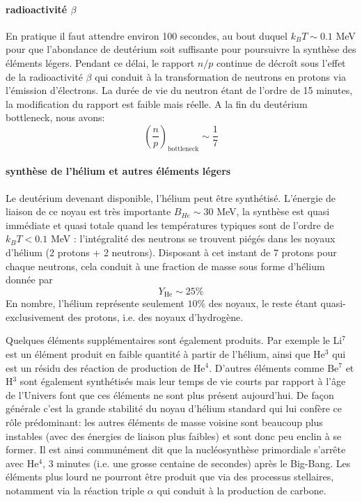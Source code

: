 \paragraph{radioactivité $\beta$} En pratique il faut attendre environ 100 secondes, au bout duquel $k_B T\sim 0.1$ MeV pour que l'abondance de deutérium soit suffisante pour poursuivre la synthèse des éléments légers. Pendant ce délai, le rapport $n/p$ continue de décroît sous l'effet de la radioactivité $\beta$ qui conduit à la transformation de neutrons en protons via l'émission d'électrons. La durée de vie du neutron étant de l'ordre de 15 minutes, la modification du rapport est faible mais réelle. A la fin du deutérium bottleneck, nous avons:
\begin{equation}
\left(\frac{n}{p}\right)_\mathrm{bottleneck} \sim \frac{1}{7}
\end{equation}

\paragraph{synthèse de l'hélium et autres éléments légers}
Le deutérium devenant disponible, l'hélium peut être synthétisé. L'énergie de liaison de ce noyau est très importante $B_{He}\sim 30$ MeV, la synthèse est quasi immédiate et quasi totale quand les températures typiques sont de l'ordre de $k_B T < 0.1$ MeV : l'intégralité des neutrons se trouvent piégés dans les noyaux d'hélium (2 protons + 2 neutrons). Disposant à cet instant de 7 protons pour chaque neutrons, cela conduit à une fraction de masse sous forme d'hélium donnée par
\begin{equation}
Y_\mathrm{He}\sim 25\%
\end{equation}
En nombre, l'hélium représente seulement $10\%$ des noyaux, le reste étant quasi-exclusivement des protons, i.e. des noyaux d'hydrogène.

Quelques éléments supplémentaires sont également produits. Par exemple le Li$^7$ est un élément produit en faible quantité à partir de l'hélium, ainsi que He$^3$ qui est un résidu des réaction de production de He$^4$. D'autres éléments comme Be$^7$ et H$^3$ sont également synthétisés mais leur temps de vie courts par rapport à l'âge de l'Univers font que ces éléments ne sont plus présent aujourd'hui. De façon générale c'est la grande stabilité du noyau d'hélium standard qui lui confère ce rôle prédominant: les autres éléments de masse voisine sont beaucoup plus instables (avec des énergies de liaison plus faibles) et sont donc peu enclin à se former. Il est ainsi communément dit que la nucléosynthèse primordiale s'arrête avec He$^4$, 3 minutes (i.e. une grosse centaine de secondes) après le Big-Bang. Les éléments plus lourd ne pourront être produit que via des processus stellaires, notamment via la réaction triple $\alpha$ qui conduit à la production de carbone.

